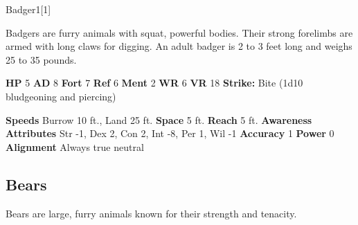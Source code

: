   
  \begin{monsection}{Badger}{1}[1]
    \vspace{-1em}\vspace{-1em}
    \vspace{0em}

    
      Badgers are furry animals with squat, powerful bodies.
      Their strong forelimbs are armed with long claws for digging.
      An adult badger is 2 to 3 feet long and weighs 25 to 35 pounds.
    
    

    \begin{spellcontent}
      \begin{spelltargetinginfo}
        \pari \textbf{HP} 5 \monsep
          \textbf{AD} 8 \monsep
          \textbf{Fort} 7 \monsep
          \textbf{Ref} 6 \monsep
          \textbf{Ment} 2
        \pari \textbf{WR} 6 \monsep
        \textbf{VR} 18
        \pari \textbf{Strike:}
            Bite  (1d10 bludgeoning and piercing)
      \end{spelltargetinginfo}
    \end{spellcontent}
    \begin{monsterfooter}
      \pari \textbf{Speeds} Burrow 10 ft., Land 25 ft. \monsep
        \textbf{Space} 5 ft. \monsep
        \textbf{Reach} 5 ft.
      \pari \textbf{Awareness} 
      \pari \textbf{Attributes}
        Str -1, Dex 2,
        Con 2, Int -8,
        Per 1, Wil -1
      \pari \textbf{Accuracy} 1 \monsep
        \textbf{Power} 0
      \pari \textbf{Alignment} Always true neutral
    \end{monsterfooter}
  \end{monsection}
  
  
    \subsection{Bears}
      
      Bears are large, furry animals known for their strength and tenacity.
    

      

